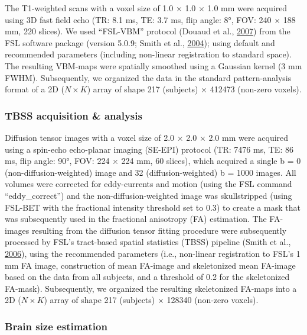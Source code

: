 \documentclass[12pt,american,a4paper,oneside,]{memoir} %
\begin{document}
The T1-weighted scans with a voxel size of 1.0 × 1.0 × 1.0 mm were acquired using 3D fast field echo (TR: 8.1 ms, TE: 3.7 ms, flip angle: 8°, FOV: 240 × 188 mm, 220 slices). We used ``FSL-VBM'' protocol (Douaud et al., \protect\hyperlink{ref-Douaud2007-sw}{2007}) from the FSL software package (version 5.0.9; Smith et al., \protect\hyperlink{ref-Smith2004-sc}{2004}); using default and recommended parameters (including non-linear registration to standard space). The resulting VBM-maps were spatially smoothed using a Gaussian kernel (3 mm FWHM). Subsequently, we organized the data in the standard pattern-analysis format of a 2D (\(N \times K\)) array of shape 217 (subjects) × 412473 (non-zero voxels).

\hypertarget{confounds-decoding-methods-data-tbss}{%
\subsubsection{TBSS acquisition \& analysis}\label{confounds-decoding-methods-data-tbss}}

Diffusion tensor images with a voxel size of 2.0 × 2.0 × 2.0 mm were acquired using a spin-echo echo-planar imaging (SE-EPI) protocol (TR: 7476 ms, TE: 86 ms, flip angle: 90°, FOV: 224 × 224 mm, 60 slices), which acquired a single b = 0 (non-diffusion-weighted) image and 32 (diffusion-weighted) b = 1000 images. All volumes were corrected for eddy-currents and motion (using the FSL command ``eddy\_correct'') and the non-diffusion-weighted image was skullstripped (using FSL-BET with the fractional intensity threshold set to 0.3) to create a mask that was subsequently used in the fractional anisotropy (FA) estimation. The FA-images resulting from the diffusion tensor fitting procedure were subsequently processed by FSL's tract-based spatial statistics (TBSS) pipeline (Smith et al., \protect\hyperlink{ref-Smith2006-sf}{2006}), using the recommended parameters (i.e., non-linear registration to FSL's 1 mm FA image, construction of mean FA-image and skeletonized mean FA-image based on the data from all subjects, and a threshold of 0.2 for the skeletonized FA-mask). Subsequently, we organized the resulting skeletonized FA-maps into a 2D (\(N \times K\)) array of shape 217 (subjects) × 128340 (non-zero voxels).

\hypertarget{confounds-decoding-methods-data-brainsize}{%
\subsubsection{Brain size estimation}\label{confounds-decoding-methods-data-brainsize}}
\end{document}
